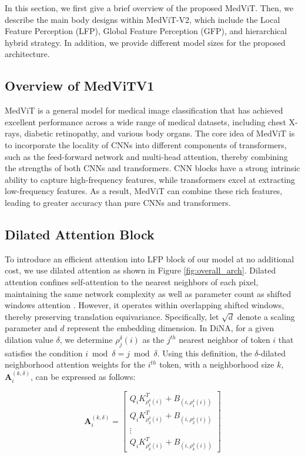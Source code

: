 \documentclass[times,twocolumn,final]{elsarticle}
\begin{document}
In this section, we first give a brief overview of the proposed MedViT. Then, we describe the main body designs within MedViT-V2, which include the Local Feature Perception (LFP), Global Feature Perception (GFP), and hierarchical hybrid strategy. In addition, we provide different model sizes for the proposed architecture.

\subsection{Overview of MedViTV1}

MedViT is a general model for medical image classification that has achieved excellent performance across a wide range of medical datasets, including chest X-rays, diabetic retinopathy, and various body organs. The core idea of MedViT is to incorporate the locality of CNNs into different components of transformers, such as the feed-forward network and multi-head attention, thereby combining the strengths of both CNNs and transformers. CNN blocks have a strong intrinsic ability to capture high-frequency features, while transformers excel at extracting low-frequency features. As a result, MedViT can combine these rich features, leading to greater accuracy than pure CNNs and transformers.

\subsection{Dilated Attention Block}

To introduce an efficient attention into LFP block of our model at no additional cost, we use dilated attention as shown in Figure \ref{fig:overall_arch}. Dilated attention confines self-attention to the nearest neighbors of each pixel, maintaining the same network complexity as well as parameter count as shifted windows attention \cite{liu2021swin}. However, it operates within overlapping shifted windows, thereby preserving translation equivariance. Specifically, let $\sqrt{d}$ denote a scaling parameter and $d$ represent the embedding dimension. In DiNA, for a given dilation value $\delta$, we determine $\rho_j^\delta(i)$ as the $j^{th}$ nearest neighbor of token $i$ that satisfies the condition  $i \bmod \delta = j \bmod \delta$. Using this definition, the $\delta$-dilated neighborhood attention weights for the $i^{th}$ token, with a neighborhood size $k$, $\mathbf{A}_i^{(k, \delta)}$, can be expressed as follows:


$$
\mathbf{A}_i^{(k, \delta)}=\left[\begin{array}{c}
Q_i K_{\rho_1^\delta(i)}^T+B_{\left(i, \rho_1^\delta(i)\right)} \\
Q_i K_{\rho_2^\delta(i)}^T+B_{\left(i, \rho_2^\delta(i)\right)} \\
\vdots \\
Q_i K_{\rho_k^\delta(i)}^T+B_{\left(i, \rho_k^\delta(i)\right)}
\end{array}\right]
$$
\end{document}
